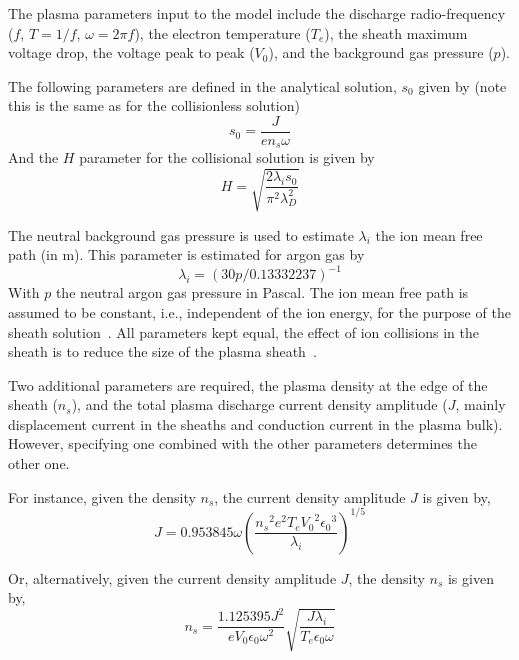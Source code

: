 The plasma parameters input to the model include the discharge radio-frequency ($f$, $T=1/f$, $\omega = 2 \pi f$), the electron temperature ($T_e$),  the sheath maximum voltage drop, the voltage peak to peak ($V_0$), and the background gas pressure ($p$).

The following parameters are defined in the analytical solution, $s_0$ given by (note this is the same as for the collisionless solution) 
\begin{equation}
s_0 = \frac{J}{e n_s \omega}
\end{equation}
And the $H$ parameter for the collisional solution is given by
\begin{equation}
H = \sqrt{  \frac{2 \lambda_i s_0}{\pi^2 \lambda_D^2}  }
\end{equation}

The neutral background gas pressure is used to estimate $\lambda_i$ the ion mean free path (in m). This parameter is estimated for argon gas by~\cite{Lieberman1989}
\begin{equation}\label{eq:lambda_i}
\lambda_i = (30 p /0.13332237)^{-1}
\end{equation}
With $p$ the neutral argon gas pressure in Pascal. The ion mean free path is assumed to be constant, i.e., independent of the ion energy, for the purpose of the sheath solution~\cite{Lieberman1989}. All parameters kept equal, the effect of ion collisions in the sheath is to reduce the size of the plasma sheath~\cite{Lieberman1989}.

Two additional parameters are required, the plasma density at the edge of the sheath ($n_s$), and the total plasma discharge current density amplitude ($J$, mainly displacement current in the sheaths and conduction current in the plasma bulk). However, specifying one combined with the other parameters determines the other one. 

For instance, given the density $n_s$, the current density amplitude $J$ is given by, 
\begin{equation}
J = 0.953845 \omega \left( \frac{ {n_s}^2 e^2 T_e {V_0}^2 {\epsilon_0}^3 }{\lambda_i}  \right)^{1/5}
\end{equation}

Or, alternatively, given the current density amplitude $J$, the density $n_s$ is given by, 
\begin{equation}
n_s = \frac{1.125395 J^2 }{e V_0 \epsilon_0 \omega^2} \sqrt{\frac{J \lambda_i }{ T_e \epsilon_0 \omega } }
\end{equation}

